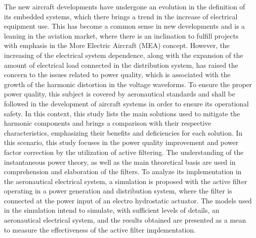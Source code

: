 The new aircraft developments have undergone an evolution in the definition of its embedded systems, which there brings a trend in the increase of electrical equipment use. This has become a common sense in new developments and is a leaning in the aviation market, where there is an inclination to fulfill projects with emphasis in the More Electric Aircraft (MEA) concept. However, the increasing of the electrical system dependence, along with the expansion of the amount of electrical load connected in the distribution system, has raised the concern to the issues related to power quality, which is associated with the growth of the harmonic distortion in the voltage waveforms. To ensure the proper power quality, this subject is covered by aeronautical standards and shall be followed in the development of aircraft systems in order to ensure its operational safety. In this context, this study lists the main solutions used to mitigate the harmonic components and brings a comparison with their respective characteristics, emphasizing their benefits and deficiencies for each solution. In this scenario, this study focuses in the power quality improvement and power factor correction by the utilization of active filtering. The understanding of the instantaneous power theory, as well as the main theoretical basis are used in comprehension and elaboration of the filters. To analyze its implementation in the aeronautical electrical system, a simulation is proposed with the active filter operating in a power generation and distribution system, where the filter is connected at the power input of an electro hydrostatic actuator. The models used in the simulation intend to simulate, with sufficient levels of details, an aeronautical electrical system, and the results obtained are presented as a mean to measure the effectiveness of the active filter implementation.